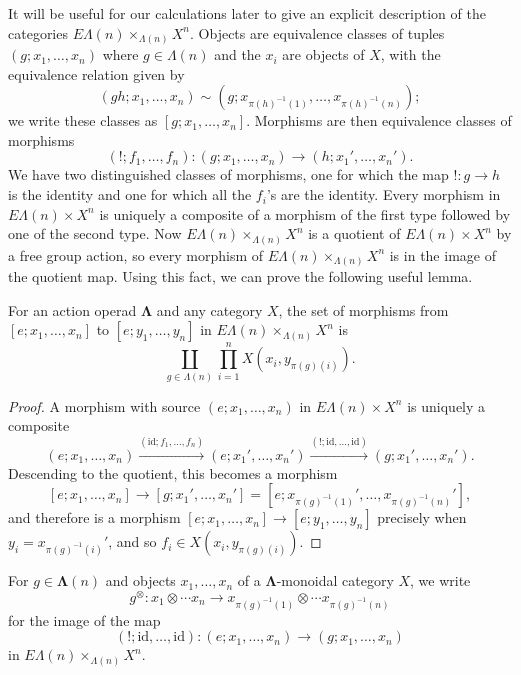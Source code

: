\documentclass{amsbook} %
\newcommand{\mb}{\mathbf}
\newcommand{\id}{\textrm{id}}
\newcommand{\ML}{\mathbf{\Lambda}}
\numberwithin{section}{chapter}
\begin{document}
It will be useful for our calculations later to give an explicit description of the categories $E\Lambda(n) \times_{\Lambda(n)} X^{n}$.  Objects are equivalence classes of tuples $(g; x_1, \ldots, x_n)$ where $g \in \Lambda(n)$ and the $x_{i}$ are objects of $X$, with the equivalence relation given by
  \[
    (gh; x_1, \ldots, x_n) \sim \left(g; x_{\pi(h)^{-1}(1)}, \ldots, x_{\pi(h)^{-1}(n)}\right);
  \]
  we write these classes as $[g; x_1, \ldots, x_n]$.  Morphisms are then equivalence classes of morphisms
  \[
    (!; f_1, \ldots, f_n) \colon  (g; x_1, \ldots, x_n) \rightarrow \left(h; x_1', \ldots, x_n'\right).
  \]
We have two distinguished classes of morphisms, one for which the map $! \colon  g \rightarrow h$ is the identity and one for which all the $f_{i}$'s are the identity.  Every morphism in $E\Lambda(n) \times X^{n}$ is uniquely a composite of a  morphism of the first type followed by one of the second type.  Now $E\Lambda(n) \times_{\Lambda(n)} X^{n}$ is a quotient of $E\Lambda(n) \times X^{n}$ by a free group action, so every morphism of $E\Lambda(n) \times_{\Lambda(n)} X^{n}$ is in the image of the quotient map.  Using this fact, we can prove the following useful lemma.

\begin{lem}\label{hom-set-lemma}
For an action operad $\mb{\Lambda}$ and any category $X$, the set of morphisms from $[e; x_1, \ldots, x_n]$ to $[e; y_1, \ldots, y_n]$ in $E\Lambda(n) \times_{\Lambda(n)} X^{n}$ is
  \[
    \coprod_{g \in \Lambda(n)} \prod_{i=1}^{n} X\left(x_i, y_{\pi(g)(i)}\right).
  \]
\end{lem}
\begin{proof}
A morphism with source $(e; x_1, \ldots, x_n)$ in $E\Lambda(n) \times X^{n}$ is uniquely a composite
  \[
    (e; x_1, \ldots, x_n) \stackrel{(\id; f_{1}, \ldots, f_{n})}{\longrightarrow} \left(e; x_1', \ldots, x_n'\right) \stackrel{(!; \id, \ldots, \id)}{\longrightarrow} \left(g; x_1', \ldots, x_n'\right).
  \]
Descending to the quotient, this becomes a morphism
  \[
    [e; x_1, \ldots, x_n] \rightarrow \left[g; x_1', \ldots, x_n'\right] = \left[e; x_{\pi(g)^{-1}(1)}', \ldots, x_{\pi(g)^{-1}(n)}'\right],
  \]
and therefore is a morphism $[e; x_1, \ldots, x_n] \rightarrow [e; y_1, \ldots, y_n]$ precisely when $y_i = x_{\pi(g)^{-1}(i)}'$, and so $f_i \in   X(x_i, y_{\pi(g)(i)})$.
\end{proof}

\begin{nota}\label{tensor_notation}
For $g \in \ML(n)$ and objects $x_1, \ldots, x_n$ of a $\ML$-monoidal category $X$, we write 
  \[
    g^{\otimes} \colon x_1 \otimes \cdots x_n \rightarrow x_{\pi(g)^{-1}(1)} \otimes \cdots x_{\pi(g)^{-1}(n)}
  \]
for the image of the map
  \[
    (!; \id, \ldots, \id) \colon  (e; x_1, \ldots, x_n) \rightarrow (g; x_1, \ldots, x_n)
  \]
in $E\Lambda(n) \times_{\Lambda(n)} X^{n}$.
\end{nota}
\end{document}

